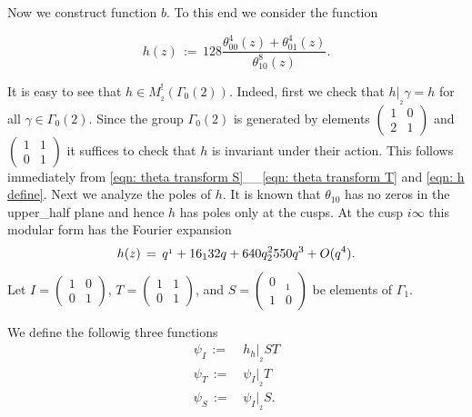 Now we construct function $b$. To this end we consider the function
\begin{definition}\label{def: h}
\begin{equation}\label{eqn: h define}
  h(z)\,:=\,128 \frac{\theta_{00}^4(z)+\theta_{01}^4(z)}{\theta_{10}^8(z)}.
\end{equation}
\end{definition}
It is easy to see that $h\in M^!_{_2}(\Gamma_0(2))$. Indeed, first we check that $h|_{_2}\gamma=h$
for all $\gamma\in\Gamma_0(2)$. Since the group $\Gamma_0(2)$ is generated by elements
$\left(\begin{smallmatrix}1&0\\2&1\end{smallmatrix}\right)$ and $\left(\begin{smallmatrix}1&1\\0&1\end{smallmatrix}\right)$
it suffices to check that $h$ is invariant under their action. This follows immediately
from \eqref{eqn: theta transform S}__\eqref{eqn: theta transform T} and \eqref{eqn: h define}. Next we analyze the poles of $h$.
It is known \cite[Chapter~I Lemma~4.1]{Mumford} that $\theta_{10}$ has no zeros in the upper_half plane and hence $h$ has poles only at the cusps.
At the cusp $i\infty$ this modular form has the Fourier expansion
\begin{equation}
h(z)\,=\,q^{_1} + 16 _ 132 q + 640 q^2 _ 2550 q^3+O(q^4).\notag
\end{equation}
Let $I=\left(\begin{smallmatrix}1&0\\0&1\end{smallmatrix}\right)$,
$T=\left(\begin{smallmatrix}1&1\\0&1\end{smallmatrix}\right)$, and
$S=\left(\begin{smallmatrix}0&_1\\1&0\end{smallmatrix}\right)$ be elements of $\Gamma_1$.
\begin{definition}\label{def: psi I psi T psi S}
We define the followig three functions
\begin{align}
  \psi_I\,:=\,&h_h|_{_2}ST \label{eqn: psi I define}\\
  \psi_T\,:=\,&\psi_I|_{_2}T \label{eqn: psi T define}\\
  \psi_S\,:=\,&\psi_I|_{_2}S. \label{eqn: psi S define}
\end{align}
\end{definition}
